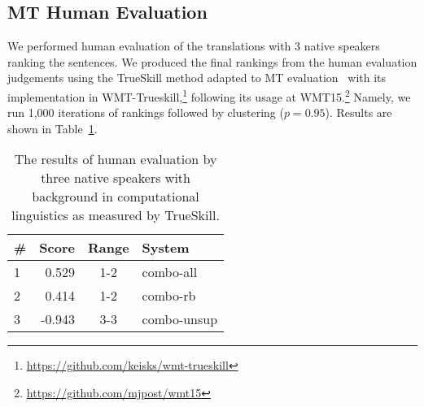 \documentclass[free]{flammie}
\begin{document}
\subsection{MT Human Evaluation}\label{subsec:humanmt-eval}

We performed human evaluation of the translations with 3 native speakers ranking the sentences. 
We produced the final rankings from the human evaluation judgements using the TrueSkill method adapted to MT evaluation~\cite{sakaguchi-post-vandurme:2014:W14-33} with its implementation in WMT-Trueskill,\footnote{\url{https://github.com/keisks/wmt-trueskill}}
following its usage at WMT15.\footnote{\url{https://github.com/mjpost/wmt15}}
Namely, we run 1,000 iterations of rankings followed by clustering ($p=0.95$).
Results are shown in Table~\ref{table:human-evaluation}.


\begin{table}[htbp]
\scriptsize{
\centering
\begin{tabular}{lrcl}
\hline
\bf \# & \bf Score & \bf Range & \bf System\\
\hline
1 & 0.529 & 1-2 & combo-all\\
2 & 0.414 & 1-2 & combo-rb\\
3 & -0.943 & 3-3 & combo-unsup\\
\hline
\end{tabular}
\caption{The results of human evaluation by three native speakers with background in computational linguistics as measured by TrueSkill. \label{table:human-evaluation}}
}
\end{table}
\end{document}

